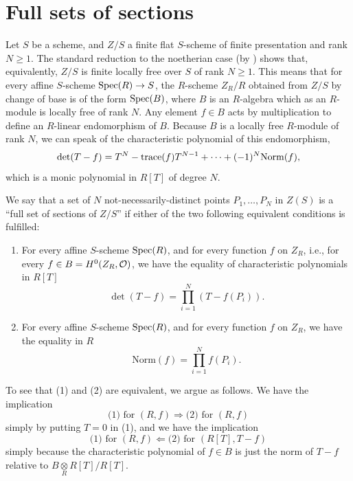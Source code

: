 \section{Full sets of sections}\label{sec:1.8}

\kmitem\label{item:1.8.1}
Let $S$ be a scheme, and $Z/S$ a finite flat $S$-scheme of finite presentation and rank $N \ge 1$. The standard reduction to the noetherian case (by \cite[IV, 8.9.1 and 11.2.6.1]{EGA}) shows that, equivalently, $Z/S$ is finite locally free over $S$ of rank $N \ge 1$. This means that for every affine $S$-scheme $\operatorname{Spec}(R) \to S$, the $R$-scheme $Z_R/R$ obtained from $Z/S$ by change of base is of the form $\operatorname{Spec}(B)$, where $B$ is an $R$-algebra which as an $R$-module is locally free of rank $N$. Any element $f \in B$ acts by multiplication to define an $R$-linear endomorphism of $B$. Because $B$ is a locally free $R$-module of rank $N$, we can speak of the characteristic polynomial of this endomorphism,
\begin{equation}\label{eq:1.8.1.1}
\det(T-f) = T^N - \operatorname{trace}(f) T^{N-1} + \cdots + (-1)^N \mathrm{Norm}(f),
\end{equation}
which is a monic polynomial in $R[T]$ of degree $N$.

\kmitem\label{item:1.8.2}
We say that a set of $N$ not-necessarily-distinct points $P_1, \dots, P_N$ in $Z(S)$ is a ``full set of sections of $Z/S$'' if either of the two following equivalent conditions is fulfilled:
\begin{enumerate}[(1)]
\item For every affine $S$-scheme $\operatorname{Spec}(R)$, and for every function $f$ on $Z_R$, i.e., for every $f \in B = H^0(Z_R, \mathcal{O})$, we have the equality of characteristic polynomials in $R[T]$
\[
\det(T-f) = \prod_{i=1}^N (T-f(P_i)).
\]
\item For every affine $S$-scheme $\operatorname{Spec}(R)$, and for every function $f$ on $Z_R$, we have the equality in $R$
\[
\mathrm{Norm}(f) = \prod_{i=1}^N f(P_i).
\]
\end{enumerate}
To see that (1) and (2) are equivalent, we argue as follows. We have the implication
\[
\text{(1) for } (R, f) \Longrightarrow \text{(2) for } (R, f)
\]
simply by putting $T = 0$ in (1), and we have the implication
\[
\text{(1) for } (R, f) \Longleftarrow \text{(2) for } (R[T], T-f)
\]
simply because the characteristic polynomial of $f \in B$ is just the norm of $T-f$ relative to $B \underset{R}{\otimes} R[T] / R[T]$.

